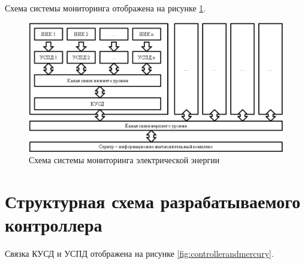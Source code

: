 Схема системы мониторинга отображена на рисунке \ref{fig:ascaepscheme}.

\begin{figure}[h!]
	\centering
		\includegraphics[scale=1.0]{img/ascaepscheme.png}
	\caption{Схема системы мониторинга электрической энергии \label{fig:ascaepscheme}}
\end{figure}

\section{Структурная схема разрабатываемого контроллера}

Связка КУСД и УСПД отображена на рисунке \ref{fig:controllerandmercury}.

